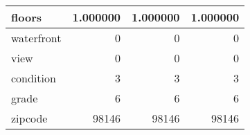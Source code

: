 \begin{table}[H]
\begin{tabular}{|l|r|r|r|}
\hline floors & \cellcolor[rgb]{0.9, 0.54, 0.52} 1.000000 & \cellcolor[rgb]{0.9, 0.54, 0.52} 1.000000 & \cellcolor[rgb]{0.9, 0.54, 0.52} 1.000000 \\
\hline waterfront & \cellcolor[rgb]{0.9, 0.54, 0.52} 0 & \cellcolor[rgb]{0.9, 0.54, 0.52} 0 & \cellcolor[rgb]{0.9, 0.54, 0.52} 0 \\
\hline view & \cellcolor[rgb]{0.9, 0.54, 0.52} 0 & \cellcolor[rgb]{0.9, 0.54, 0.52} 0 & \cellcolor[rgb]{0.9, 0.54, 0.52} 0 \\
\hline condition & \cellcolor[rgb]{0.9, 0.54, 0.52} 3 & \cellcolor[rgb]{0.9, 0.54, 0.52} 3 & \cellcolor[rgb]{0.9, 0.54, 0.52} 3 \\
\hline grade & \cellcolor[rgb]{0.9, 0.54, 0.52} 6 & \cellcolor[rgb]{0.9, 0.54, 0.52} 6 & \cellcolor[rgb]{0.9, 0.54, 0.52} 6 \\
\hline zipcode & \cellcolor[rgb]{0.9, 0.54, 0.52} 98146 & \cellcolor[rgb]{0.9, 0.54, 0.52} 98146 & \cellcolor[rgb]{0.9, 0.54, 0.52} 98146 \\
\hline
\end{tabular}
\end{table}
